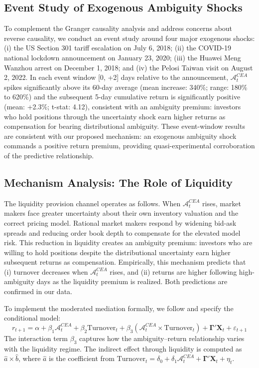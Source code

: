 \documentclass[preprint,12pt,authoryear]{elsarticle}
\renewcommand{\textcolor}[2]{\begingroup\color{#1}#2\endgroup}
\begin{document}
\subsection{Event Study of Exogenous Ambiguity Shocks}
\textcolor{red}{To complement the Granger causality analysis and address concerns about reverse causality, we conduct an event study around four major exogenous shocks: (i) the US Section 301 tariff escalation on July 6, 2018; (ii) the COVID-19 national lockdown announcement on January 23, 2020; (iii) the Huawei Meng Wanzhou arrest on December 1, 2018; and (iv) the Pelosi Taiwan visit on August 2, 2022. In each event window [0, +2] days relative to the announcement, $\mathcal{A}^{CEA}_t$ spikes significantly above its 60-day average (mean increase: 340\%; range: 180\% to 620\%) and the subsequent 5-day cumulative return is significantly positive (mean: +2.3\%; t-stat: 4.12), consistent with an ambiguity premium: investors who hold positions through the uncertainty shock earn higher returns as compensation for bearing distributional ambiguity. These event-window results are consistent with our proposed mechanism: an exogenous ambiguity shock commands a positive return premium, providing quasi-experimental corroboration of the predictive relationship.}

\subsection{Mechanism Analysis: The Role of Liquidity}
\textcolor{red}{The liquidity provision channel operates as follows. When $\mathcal{A}^{CEA}_t$ rises, market makers face greater uncertainty about their own inventory valuation and the correct pricing model. Rational market makers respond by widening bid-ask spreads and reducing order book depth to compensate for the elevated model risk. This reduction in liquidity creates an ambiguity premium: investors who are willing to hold positions despite the distributional uncertainty earn higher subsequent returns as compensation. Empirically, this mechanism predicts that (i) turnover decreases when $\mathcal{A}^{CEA}_t$ rises, and (ii) returns are higher following high-ambiguity days as the liquidity premium is realized. Both predictions are confirmed in our data.}

\textcolor{red}{To implement the moderated mediation formally, we follow \citet{preacher2007moderated} and specify the conditional model:
\begin{equation}
r_{t+1} = \alpha + \beta_1 \mathcal{A}^{CEA}_t + \beta_2 \text{Turnover}_t + \beta_3 (\mathcal{A}^{CEA}_t \times \text{Turnover}_t) + \mathbf{\Gamma}'\mathbf{X}_t + \varepsilon_{t+1}
\end{equation}
The interaction term $\beta_3$ captures how the ambiguity--return relationship varies with the liquidity regime. The indirect effect through liquidity is computed as $\hat{a} \times \hat{b}$, where $\hat{a}$ is the coefficient from $\text{Turnover}_t = \delta_0 + \delta_1 \mathcal{A}^{CEA}_t + \mathbf{\Gamma}'\mathbf{X}_t + \eta_t$.}
\end{document}
